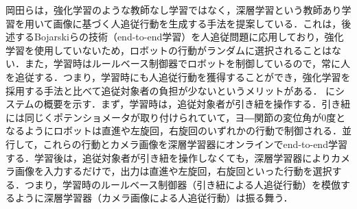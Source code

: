 岡田ら\cite{okada}は，強化学習のような教師なし学習ではなく，深層学習\cite{yann2}という教師あり学習を用いて画像に基づく人追従行動を生成する手法を提案している．これは，後述するBojarskiら\cite{bojarski}の技術（end-to-end学習）を人追従問題に応用しており，強化学習を使用していないため，ロボットの行動がランダムに選択されることはない．また，学習時はルールベース制御器でロボットを制御しているので，常に人を追従する．つまり，学習時にも人追従行動を獲得することができ，強化学習を採用する手法と比べて追従対象者の負担が少ないというメリットがある．
にシステムの概要を示す．まず，学習時は，追従対象者が引き紐を操作する．引き紐には同じくポテンショメータが取り付けられていて，ヨ―関節の変位角が0度となるようにロボットは直進や左旋回，右旋回のいずれかの行動で制御される．並行して，これらの行動とカメラ画像を深層学習器にオンラインでend-to-end学習する．学習後は，追従対象者が引き紐を操作しなくても，深層学習器によりカメラ画像を入力するだけで，出力は直進や左旋回，右旋回といった行動を選択する．つまり，学習時のルールベース制御器（引き紐による人追従行動）を模倣するように深層学習器（カメラ画像による人追従行動）は振る舞う．

